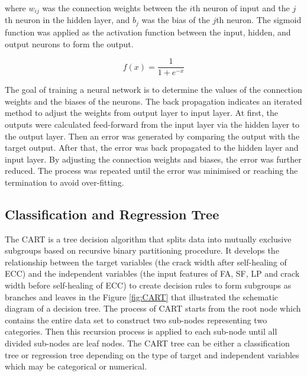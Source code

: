 \documentclass[11pt]{article}
\begin{document}
	where $w_{ij}$ was the connection weights between the $i$th neuron of input and the $j$th neuron in the hidden layer, and $b_j$ was the bias of the $j$th neuron. The sigmoid function was applied as the activation function between the input, hidden, and output neurons to form the output. 
	
	\begin{equation}
	f(x) = \frac{1}{1+e^{-x}}
	\end{equation}
	
	The goal of training a neural network is to determine the values of the connection weights and the biases of the neurons. The back propagation indicates an iterated method to adjust the weights from output layer to input layer. At first, the outputs were calculated feed-forward from the input layer via the hidden layer to the output layer. Then an error was generated by comparing the output with the target output. After that, the error was back propagated to the hidden layer and input layer. By adjusting the connection weights and biases, the error was further reduced. The process was repeated until the error was minimised or reaching the termination to avoid over-fitting. 
	
	\subsection{Classification and Regression Tree}
		The CART \cite{breiman2017classification}  is a tree decision algorithm that splits data into mutually exclusive subgroups based on recursive binary partitioning procedure. It develops the relationship between the target variables (the crack width after self-healing of ECC) and the independent variables (the input features of FA, SF, LP and crack width before self-healing of ECC) to create decision rules to form subgroups as branches and leaves in the Figure \ref{fig:CART} that illustrated the schematic diagram of a decision tree. The process of CART starts from the root node which contains the entire data set to construct two sub-nodes representing two categories. Then this recursion process is applied to each sub-node until all divided sub-nodes are leaf nodes. The CART tree can be either a classification tree \cite{dan1995cart} or regression tree \cite{put2003classification} depending on the type of target and independent variables which may be categorical or numerical. 
	
\end{document}
